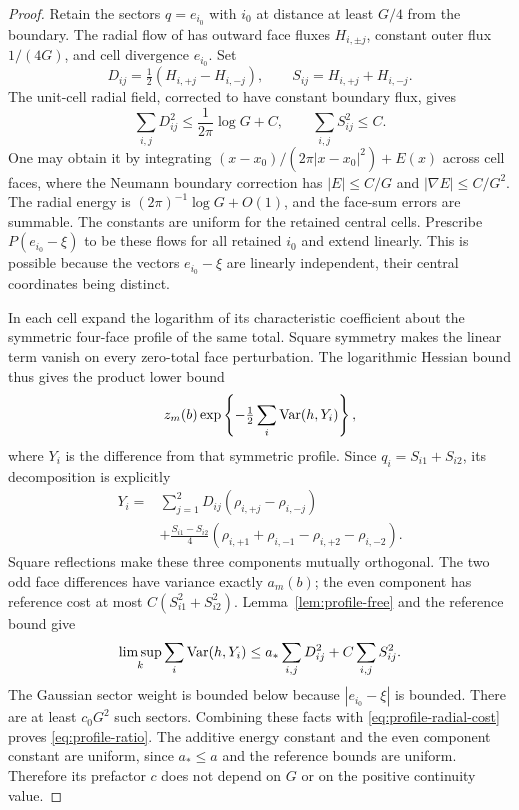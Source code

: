 \begin{proof}
Retain the sectors $q=e_{i_0}$ with $i_0$ at distance at least $G/4$
from the boundary. The radial flow of \cite[Equation~(2.14)]{X} has outward face
fluxes $H_{i,\pm j}$, constant outer flux $1/(4G)$, and cell
divergence $e_{i_0}$. Set
\[
 D_{ij}=\tfrac12(H_{i,+j}-H_{i,-j}),\qquad
 S_{ij}=H_{i,+j}+H_{i,-j}.
\]
The unit-cell radial field, corrected to have constant boundary flux,
gives
\begin{equation}\label{eq:profile-radial-cost}
 \sum_{i,j}D_{ij}^2\le\frac1{2\pi}\log G+C,
 \qquad \sum_{i,j}S_{ij}^2\le C.
\end{equation}
One may obtain it by integrating
$(x-x_0)/(2\pi|x-x_0|^2)+E(x)$ across cell faces, where the Neumann
boundary correction has $|E|\le C/G$ and $|\nabla E|\le C/G^2$.
The radial energy is $(2\pi)^{-1}\log G+O(1)$, and the face-sum
errors are summable. The constants are uniform for the retained
central cells. Prescribe $P(e_{i_0}-\xi)$ to be these flows for all
retained $i_0$ and extend linearly. This is possible because the
vectors $e_{i_0}-\xi$ are linearly independent, their central
coordinates being distinct.

In each cell expand the logarithm of its characteristic coefficient
about the symmetric four-face profile of the same total. Square
symmetry makes the linear term vanish on every zero-total face
perturbation. The logarithmic Hessian bound thus gives the product
lower bound
\begin{equation}\label{eq:profile-relative-lower}
        z_m(b)\exp\left\{-\tfrac12\sum_i\operatorname{Var}(h,Y_i)\right\},
\end{equation}
where $Y_i$ is the difference from that symmetric profile. Since
$q_i=S_{i1}+S_{i2}$, its decomposition is explicitly
\begin{align*}
 Y_i={}&\sum_{j=1}^2D_{ij}(\rho_{i,+j}-\rho_{i,-j})\\
 &+\frac{S_{i1}-S_{i2}}4
   (\rho_{i,+1}+\rho_{i,-1}-\rho_{i,+2}-\rho_{i,-2}).
\end{align*}
Square reflections make these three components mutually orthogonal.
The two odd face differences have variance exactly $a_m(b)$; the even
component has reference cost at most $C(S_{i1}^2+S_{i2}^2)$. Lemma~\ref{lem:profile-free} and
the reference bound give
\[
 \limsup_k\sum_i\operatorname{Var}(h,Y_i)
       \le a_*\sum_{i,j}D_{ij}^2+C\sum_{i,j}S_{ij}^2.
\]
The Gaussian sector weight is bounded below because
$|e_{i_0}-\xi|$ is bounded. There are at least $c_0G^2$ such sectors.
Combining these facts with \eqref{eq:profile-radial-cost} proves
\eqref{eq:profile-ratio}. The additive energy constant and the even
component constant are uniform, since $a_*\le a$ and the reference
bounds are uniform. Therefore its prefactor $c$ does not depend on
$G$ or on the positive continuity value.


\end{proof}

